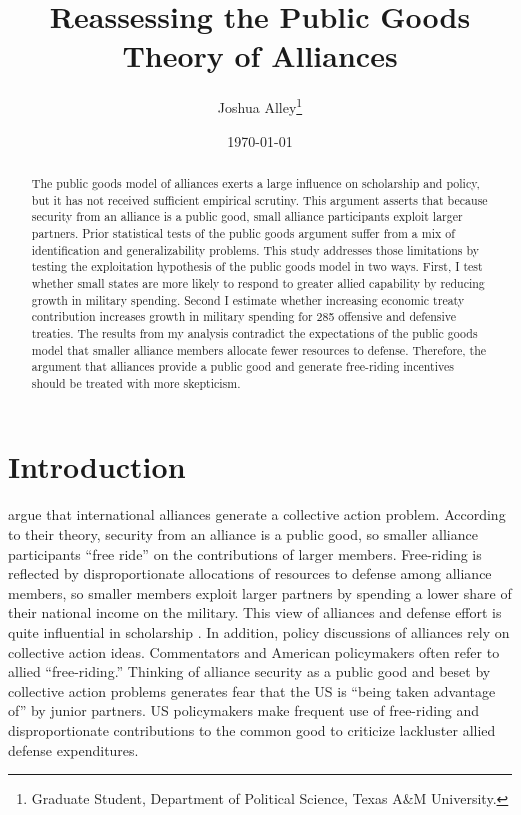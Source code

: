 \documentclass[12pt]{article}
\title{
\textbf{Reassessing the Public Goods Theory of Alliances}
	}
\author{Joshua Alley\footnote{Graduate Student,
Department of Political Science, Texas A\&M University.}}
\date{{\normalsize \today}}
\begin{document}
\maketitle 

\doublespace

\begin{abstract}
The public goods model of alliances exerts a large influence on scholarship and policy, but it has not received sufficient empirical scrutiny. 
This argument asserts that because security from an alliance is a public good, small alliance participants exploit larger partners. 
Prior statistical tests of the public goods argument suffer from a mix of identification and generalizability problems. 
This study addresses those limitations by testing the exploitation hypothesis of the public goods model in two ways. 
First, I test whether small states are more likely to respond to greater allied capability by reducing growth in military spending. 
Second I estimate whether increasing economic treaty contribution increases growth in military spending for 285 offensive and defensive treaties. 
The results from my analysis contradict the expectations of the public goods model that smaller alliance members allocate fewer resources to defense. 
Therefore, the argument that alliances provide a public good and generate free-riding incentives should be treated with more skepticism. 

\end{abstract} 



\section{Introduction}



\citet{OlsonZeckhauser1966} argue that international alliances generate a collective action problem. 
According to their theory, security from an alliance is a public good, so smaller alliance participants ``free ride'' on the contributions of larger members. 
Free-riding is reflected by disproportionate allocations of resources to defense among alliance members, so smaller members exploit larger partners by spending a lower share of their national income on the military.
This view of alliances and defense effort is quite influential in scholarship \citep{Walt1990, Mearsheimer1994, SandlerHartley2001, Garfinkel2004, Walt2009, Barrett2010}. 
In addition, policy discussions of alliances rely on collective action ideas.
Commentators and American policymakers often refer to allied ``free-riding.'' 
Thinking of alliance security as a public good and beset by collective action problems generates fear that the US is ``being taken advantage of'' by junior partners. 
US policymakers make frequent use of free-riding and disproportionate contributions to the common good to criticize lackluster allied defense expenditures.  
\end{document}
